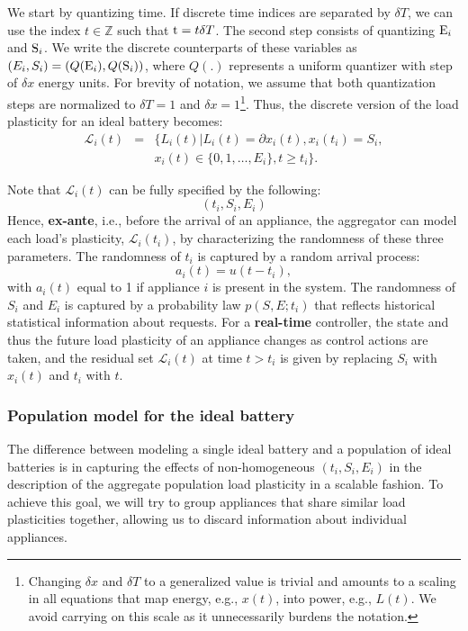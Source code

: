 \documentclass[10pt]{IEEEtran}
\begin{document}
We start by quantizing time. If discrete time indices are separated by $\delta T$, we can use the index $t\in \mathbb{Z}$ such that ${\rm t}=t\delta T$.  
The second step consists of quantizing ${\rm E}_i$ and ${\rm S}_i$. We write the discrete counterparts of these variables as $(E_i, S_i) = (Q({\rm E}_i), Q({\rm S}_i))$, where $Q(.)$ represents a uniform quantizer with step of $\delta x$ energy units. For brevity of notation, we assume that both quantization steps are normalized to $\delta T=1$ and $\delta x=1$\footnote{Changing $\delta x$ and $\delta T$ to a generalized value is trivial and amounts to a scaling in all equations that map energy, e.g., $x(t)$, into power, e.g., $L(t)$. We avoid carrying on this scale as it unnecessarily burdens the notation. }.   Thus, the discrete version of the load plasticity for an ideal battery becomes:
  \begin{eqnarray}\nonumber
{\mathcal L}_i(t)&=&\{L_i(t) |  L_i(t) = \partial x_i(t), x_i(t_i) = S_i, \\
				& &x_i(t) \in \{0,1,\ldots, E_i\}, t\geq t_i \}\label{lossless-battery-discrete}.
\end{eqnarray}


Note that $ {\mathcal L}_i(t)$ can be fully specified by the following:
$$(t_i, S_i, E_i)$$
Hence,  {\bf ex-ante}, i.e., before the arrival of an appliance, the aggregator can model each load's plasticity, ${\mathcal L}_i(t_i)$, by characterizing the randomness of these three  parameters. The randomness of $t_i$ is captured by a random arrival process: 
\begin{equation}a_i(t)=u(t-t_i),\label{arrivaldef}\end{equation}
with $a_i(t)$ equal to 1 if appliance $i$ is present in the system. The randomness of $S_i$ and $E_i$ is captured by a probability law $p(S,E; t_i)$ that reflects historical statistical information about requests.
  For a {\bf real-time} controller, the state and thus the future load plasticity of an appliance  changes  as control actions are taken, and the residual set  ${\mathcal L}_i(t)$ at  time $ t>t_i$ is given by replacing  $S_i$ with  $x_i(t)$ and $t_i$ with $t$.


\subsubsection{Population model for the ideal battery}\label{idealbat.pop}
The difference between modeling a single ideal battery and a population of ideal batteries is in capturing the effects of non-homogeneous $(t_i, S_i, E_i)$ in the description of the aggregate population load plasticity in a scalable fashion. To achieve this goal, we will try to group appliances that share similar load plasticities together, allowing us to discard information about individual appliances.
\end{document}
